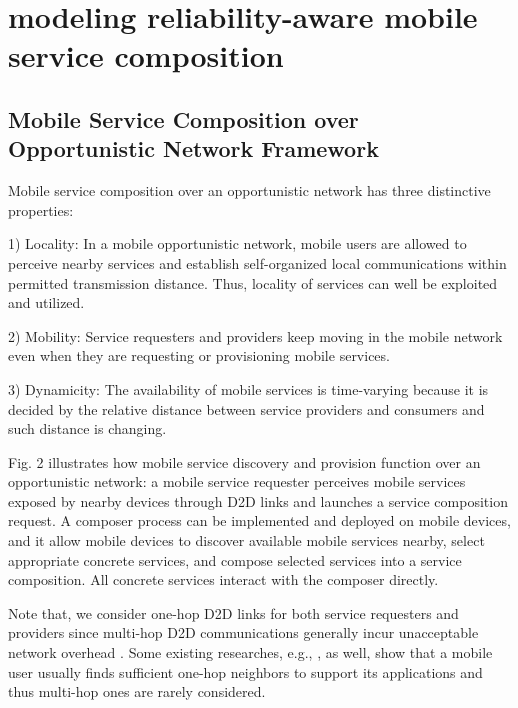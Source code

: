 \documentclass[journal]{IEEEtran}
\begin{document}
\section{modeling reliability-aware mobile service composition}

\subsection{Mobile Service Composition over Opportunistic Network Framework}

Mobile service composition over an opportunistic network has three distinctive properties:

1) Locality: In a mobile opportunistic network, mobile users are allowed to perceive nearby services and establish self-organized local communications within permitted transmission distance. Thus, locality of services can well be exploited and utilized.

2) Mobility: Service requesters and providers keep moving in the mobile network even when they are requesting or provisioning mobile services.

3) Dynamicity: The availability of mobile services is time-varying because it is decided by the relative distance between service providers and consumers and such distance is changing.

Fig. 2 illustrates how mobile service discovery and provision function over an opportunistic network: a mobile service requester perceives mobile services exposed by nearby devices through D2D links and launches a service composition request. 
A composer process can be implemented and deployed on mobile devices, and it allow mobile devices to discover available mobile services nearby, select appropriate concrete services, and compose selected services into a service composition. 
All concrete services interact with the composer directly.

Note that, we consider one-hop D2D links for both service requesters and providers since multi-hop D2D communications generally incur unacceptable network overhead \cite{li2014can}. 
Some existing researches, e.g., \cite{chang2015progressive, tuncay2013participant, wu2013homing, jiang2016exploiting, liu2013exploring}, as well, show that a mobile user usually finds sufficient one-hop neighbors to support its applications and thus multi-hop ones are rarely considered.

\end{document}
